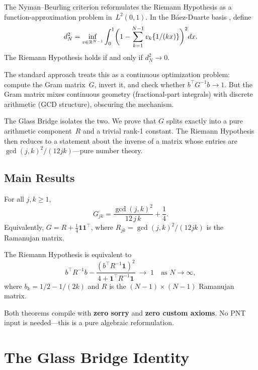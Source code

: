 \documentclass[11pt,a4paper]{article}
\begin{document}
The Nyman--Beurling criterion \cite{nyman1950,beurling1955}
reformulates the Riemann Hypothesis as a function-approximation
problem in~$L^2(0,1)$. In the B\'aez-Duarte basis
\cite{baezduarte2003}, define
\[
  d_N^2 = \inf_{v \in \mathbb{R}^{N-1}} \int_0^1
    \biggl(1 - \sum_{k=1}^{N-1} v_k \{1/(kx)\}\biggr)^2 dx.
\]
The Riemann Hypothesis holds if and only if $d_N^2 \to 0$.

The standard approach treats this as a continuous optimization
problem: compute the Gram matrix~$G$, invert it, and check
whether $b^\top G^{-1} b \to 1$. But the Gram matrix mixes
continuous geometry (fractional-part integrals) with discrete
arithmetic (GCD structure), obscuring the mechanism.

The Glass Bridge isolates the two. We prove that $G$ splits
exactly into a pure arithmetic component~$R$ and a trivial
rank-1 constant. The Riemann Hypothesis then reduces to a
statement about the inverse of a matrix whose entries are
$\gcd(j,k)^2/(12jk)$---pure number theory.

\subsection{Main Results}

\begin{theorem}
\label{thm:glass}
For all $j, k \geq 1$,
\[
  G_{jk} = \frac{\gcd(j,k)^2}{12\,j\,k} + \frac{1}{4}.
\]
Equivalently, $G = R + \frac{1}{4}\mathbf{1}\mathbf{1}^\top$,
where $R_{jk} = \gcd(j,k)^2/(12jk)$ is the Ramanujan matrix.
\end{theorem}

\begin{theorem}
\label{thm:arith-rh}
The Riemann Hypothesis is equivalent to
\[
  b^\top R^{-1} b - \frac{(b^\top R^{-1} \mathbf{1})^2}
    {4 + \mathbf{1}^\top R^{-1} \mathbf{1}} \;\longrightarrow\; 1
  \quad\text{as } N \to \infty,
\]
where $b_k = 1/2 - 1/(2k)$ and $R$ is the
$(N{-}1) \times (N{-}1)$ Ramanujan matrix.
\end{theorem}

\noindent
Both theorems compile with \textbf{zero sorry} and \textbf{zero
custom axioms}. No PNT input is needed---this is a pure algebraic
reformulation.

\section{The Glass Bridge Identity}
\label{sec:identity}
\end{document}
